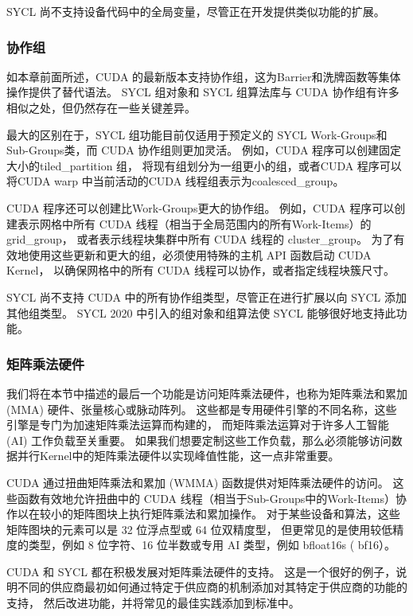 SYCL 尚不支持设备代码中的全局变量，尽管正在开发提供类似功能的扩展。

\subsubsection{协作组}
如本章前面所述，CUDA 的最新版本支持协作组，这为Barrier和洗牌函数等集体操作提供了替代语法。 
SYCL 组对象和 SYCL 组算法库与 CUDA 协作组有许多相似之处，但仍然存在一些关键差异。

最大的区别在于，SYCL 组功能目前仅适用于预定义的 SYCL Work-Groups和Sub-Groups类，而 CUDA 协作组则更加灵活。 
例如，CUDA 程序可以创建固定大小的tiled\_partition 组，
将现有组划分为一组更小的组，或者CUDA 程序可以将CUDA warp 中当前活动的CUDA 线程组表示为coalesced\_group。

CUDA 程序还可以创建比Work-Groups更大的协作组。 
例如，CUDA 程序可以创建表示网格中所有 CUDA 线程（相当于全局范围内的所有Work-Items）的 grid\_group，
或者表示线程块集群中所有 CUDA 线程的 cluster\_group。 
为了有效地使用这些更新和更大的组，必须使用特殊的主机 API 函数启动 CUDA Kernel，
以确保网格中的所有 CUDA 线程可以协作，或者指定线程块簇尺寸。

SYCL 尚不支持 CUDA 中的所有协作组类型，尽管正在进行扩展以向 SYCL 添加其他组类型。 
SYCL 2020 中引入的组对象和组算法使 SYCL 能够很好地支持此功能。

\subsubsection{矩阵乘法硬件}
我们将在本节中描述的最后一个功能是访问矩阵乘法硬件，也称为矩阵乘法和累加 (MMA) 硬件、张量核心或脉动阵列。 
这些都是专用硬件引擎的不同名称，这些引擎是专门为加速矩阵乘法运算而构建的，
而矩阵乘法运算对于许多人工智能 (AI) 工作负载至关重要。 
如果我们想要定制这些工作负载，那么必须能够访问数据并行Kernel中的矩阵乘法硬件以实现峰值性能，这一点非常重要。

CUDA 通过扭曲矩阵乘法和累加 (WMMA) 函数提供对矩阵乘法硬件的访问。 
这些函数有效地允许扭曲中的 CUDA 线程（相当于Sub-Groups中的Work-Items）协作以在较小的矩阵图块上执行矩阵乘法和累加操作。 
对于某些设备和算法，这些矩阵图块的元素可以是 32 位浮点型或 64 位双精度型，
但更常见的是使用较低精度的类型，例如 8 位字符、16 位半数或专用 AI 类型，例如 bfloat16s ( bf16）。

CUDA 和 SYCL 都在积极发展对矩阵乘法硬件的支持。 
这是一个很好的例子，说明不同的供应商最初如何通过特定于供应商的机制添加对其特定于供应商的功能的支持，
然后改进功能，并将常见的最佳实践添加到标准中。

